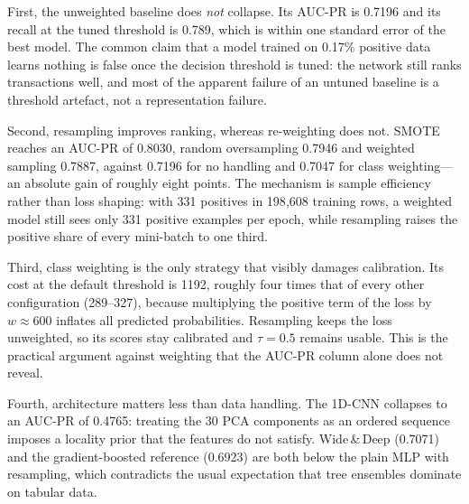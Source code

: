 \documentclass[conference]{IEEEtran}
\begin{document}
First, the unweighted baseline does \emph{not} collapse. Its AUC-PR is 0.7196
and its recall at the tuned threshold is 0.789, which is within one standard
error of the best model. The common claim that a model trained on 0.17\%
positive data learns nothing is false once the decision threshold is tuned:
the network still ranks transactions well, and most of the apparent failure of
an untuned baseline is a threshold artefact, not a representation failure.

Second, resampling improves ranking, whereas re-weighting does not. SMOTE
reaches an AUC-PR of 0.8030, random oversampling 0.7946 and weighted sampling
0.7887, against 0.7196 for no handling and 0.7047 for class weighting---an
absolute gain of roughly eight points. The mechanism is sample efficiency
rather than loss shaping: with 331 positives in 198{,}608 training rows, a
weighted model still sees only 331 positive examples per epoch, while
resampling raises the positive share of every mini-batch to one third.

Third, class weighting is the only strategy that visibly damages calibration.
Its cost at the default threshold is 1192, roughly four times that of every
other configuration (289--327), because multiplying the positive term of the
loss by $w\approx 600$ inflates all predicted probabilities. Resampling keeps
the loss unweighted, so its scores stay calibrated and $\tau=0.5$ remains
usable. This is the practical argument against weighting that the AUC-PR
column alone does not reveal.

Fourth, architecture matters less than data handling. The 1D-CNN collapses to
an AUC-PR of 0.4765: treating the 30 PCA components as an ordered sequence
imposes a locality prior that the features do not satisfy. Wide\,\&\,Deep
(0.7071) and the gradient-boosted reference (0.6923) are both below the plain
MLP with resampling, which contradicts the usual expectation that tree
ensembles dominate on tabular data.
\end{document}
